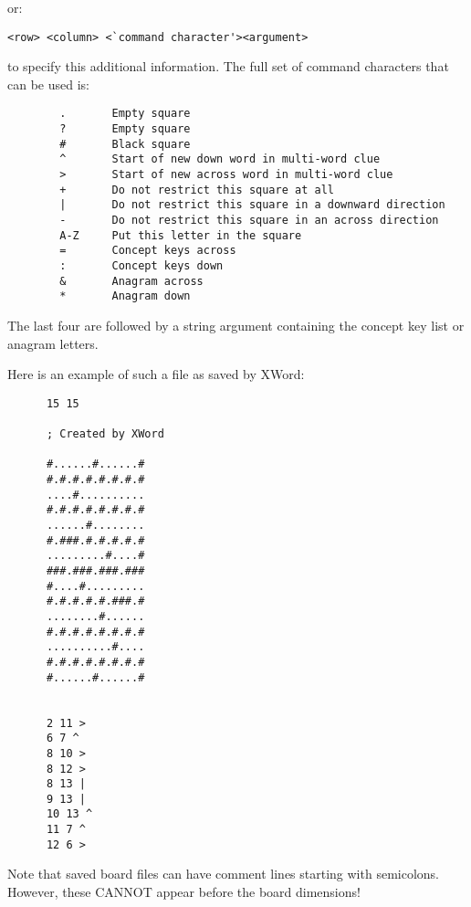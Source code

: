 or:

\begin{verbatim}
<row> <column> <`command character'><argument>
\end{verbatim}

to specify this additional information. The full set of 
command characters that can be used is:

\begin{verbatim}
       	.       Empty square
       	?       Empty square
       	#       Black square
       	^       Start of new down word in multi-word clue
       	>       Start of new across word in multi-word clue
       	+       Do not restrict this square at all
       	|       Do not restrict this square in a downward direction
       	-       Do not restrict this square in an across direction
       	A-Z     Put this letter in the square
       	=       Concept keys across
        :       Concept keys down
       	&       Anagram across
        *       Anagram down
\end{verbatim}

The last four are followed by a string argument containing the concept
key list or anagram letters.

Here is an example of such a file as saved by XWord:
      
\begin{verbatim}
      15 15
      
      ; Created by XWord

      #......#......#
      #.#.#.#.#.#.#.#
      ....#..........
      #.#.#.#.#.#.#.#
      ......#........
      #.###.#.#.#.#.#
      .........#....#
      ###.###.###.###
      #....#.........
      #.#.#.#.#.###.#
      ........#......
      #.#.#.#.#.#.#.#
      ..........#....
      #.#.#.#.#.#.#.#
      #......#......#
      
      
      2 11 >
      6 7 ^
      8 10 >
      8 12 >
      8 13 |
      9 13 |
      10 13 ^
      11 7 ^
      12 6 >
\end{verbatim}
      
Note that saved board files can have comment lines starting with 
semicolons. However, these CANNOT appear before the board dimensions!


